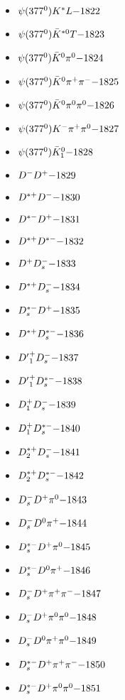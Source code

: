 \begin{multicols}{3}
\begin{itemize}
 \item $ \psi(377^{0}) K^{*}L \hfill{-1822}$
 \item $ \psi(377^{0}) \bar{K}^{*0}T \hfill{-1823}$
 \item $ \psi(377^{0}) \bar{K}^{0} \pi^{0} \hfill{-1824}$
 \item $ \psi(377^{0}) \bar{K}^{0} \pi^{+} \pi^{-} \hfill{-1825}$
 \item $ \psi(377^{0}) \bar{K}^{0} \pi^{0} \pi^{0} \hfill{-1826}$
 \item $ \psi(377^{0}) K^{-} \pi^{+} \pi^{0} \hfill{-1827}$
 \item $ \psi(377^{0}) \bar{K}_{1}^{0} \hfill{-1828}$
 \item $ D^{-} D^{+} \hfill{-1829}$
 \item $ D^{*+} D^{-} \hfill{-1830}$
 \item $ D^{*-} D^{+} \hfill{-1831}$
 \item $ D^{*+} D^{*-} \hfill{-1832}$
 \item $ D^{+} D_{s}^{-} \hfill{-1833}$
 \item $ D^{*+} D_{s}^{-} \hfill{-1834}$
 \item $ D_{s}^{*-} D^{+} \hfill{-1835}$
 \item $ D^{*+} D_{s}^{*-} \hfill{-1836}$
 \item $ {D^{\prime}}_{1}^{+} D_{s}^{-} \hfill{-1837}$
 \item $ {D^{\prime}}_{1}^{+} D_{s}^{*-} \hfill{-1838}$
 \item $ D_{1}^{+} D_{s}^{-} \hfill{-1839}$
 \item $ D_{1}^{+} D_{s}^{*-} \hfill{-1840}$
 \item $ D_{2}^{*+} D_{s}^{-} \hfill{-1841}$
 \item $ D_{2}^{*+} D_{s}^{*-} \hfill{-1842}$
 \item $ D_{s}^{-} D^{+} \pi^{0} \hfill{-1843}$
 \item $ D_{s}^{-} D^{0} \pi^{+} \hfill{-1844}$
 \item $ D_{s}^{*-} D^{+} \pi^{0} \hfill{-1845}$
 \item $ D_{s}^{*-} D^{0} \pi^{+} \hfill{-1846}$
 \item $ D_{s}^{-} D^{+} \pi^{+} \pi^{-} \hfill{-1847}$
 \item $ D_{s}^{-} D^{+} \pi^{0} \pi^{0} \hfill{-1848}$
 \item $ D_{s}^{-} D^{0} \pi^{+} \pi^{0} \hfill{-1849}$
 \item $ D_{s}^{*-} D^{+} \pi^{+} \pi^{-} \hfill{-1850}$
 \item $ D_{s}^{*-} D^{+} \pi^{0} \pi^{0} \hfill{-1851}$

\end{itemize}
\end{multicols}
